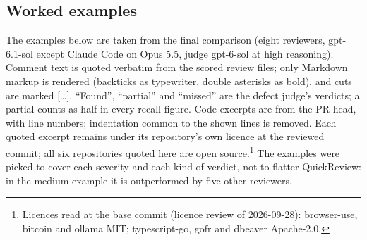 \documentclass[11pt,a4paper]{article}
\newcommand{\qcr}{QuickReview}
\begin{document}
\subsection{Worked examples}
\label{sec:examples}
\begingroup\sloppy


The examples below are taken from the final comparison (eight reviewers,
gpt-6.1-sol except Claude Code on Opus 5.5, judge gpt-6-sol at high
reasoning). Comment text is quoted verbatim from the scored review files;
only Markdown markup is rendered (backticks as typewriter, double asterisks
as bold), and cuts are marked [\ldots]. ``Found'', ``partial'' and
``missed'' are the defect judge's verdicts; a partial counts as half in
every recall figure. Code excerpts are from the PR head, with line numbers; indentation
common to the shown lines is removed. Each quoted excerpt remains under
its repository's own licence at the reviewed commit; all six repositories
quoted here are open source.\footnote{Licences read at the base commit
(licence review of 2026-09-28): browser-use, bitcoin and ollama MIT;
typescript-go, gofr and dbeaver Apache-2.0.} The examples were picked to cover each
severity and each kind of verdict, not to flatter \qcr{}: in the medium
example it is outperformed by five other reviewers.
\end{document}
